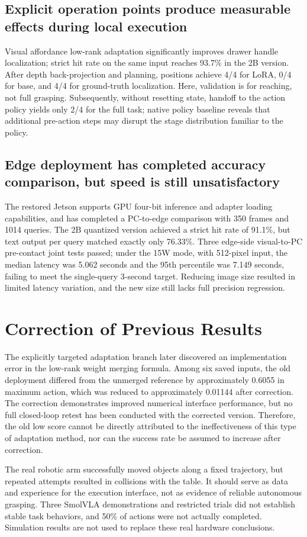 \subsection{Explicit operation points produce measurable effects during local execution}
Visual affordance low-rank adaptation significantly improves drawer handle localization; strict hit rate on the same input reaches 93.7\% in the 2B version. After depth back-projection and planning, positions achieve 4/4 for LoRA, 0/4 for base, and 4/4 for ground-truth localization. Here, validation is for reaching, not full grasping. Subsequently, without resetting state, handoff to the action policy yields only 2/4 for the full task; native policy baseline reveals that additional pre-action steps may disrupt the stage distribution familiar to the policy.
\subsection{Edge deployment has completed accuracy comparison, but speed is still unsatisfactory}
The restored Jetson supports GPU four-bit inference and adapter loading capabilities, and has completed a PC-to-edge comparison with 350 frames and 1014 queries. The 2B quantized version achieved a strict hit rate of 91.1\%, but text output per query matched exactly only 76.33\%. Three edge-side visual-to-PC pre-contact joint tests passed; under the 15W mode, with 512-pixel input, the median latency was 5.062 seconds and the 95th percentile was 7.149 seconds, failing to meet the single-query 3-second target. Reducing image size resulted in limited latency variation, and the new size still lacks full precision regression.
\section{Correction of Previous Results}
The explicitly targeted adaptation branch later discovered an implementation error in the low-rank weight merging formula. Among six saved inputs, the old deployment differed from the unmerged reference by approximately 0.6055 in maximum action, which was reduced to approximately 0.01144 after correction. The correction demonstrates improved numerical interface performance, but no full closed-loop retest has been conducted with the corrected version. Therefore, the old low score cannot be directly attributed to the ineffectiveness of this type of adaptation method, nor can the success rate be assumed to increase after correction.

The real robotic arm successfully moved objects along a fixed trajectory, but repeated attempts resulted in collisions with the table. It should serve as data and experience for the execution interface, not as evidence of reliable autonomous grasping. Three SmolVLA demonstrations and restricted trials did not establish stable task behaviors, and 50\% of actions were not actually completed. Simulation results are not used to replace these real hardware conclusions.

